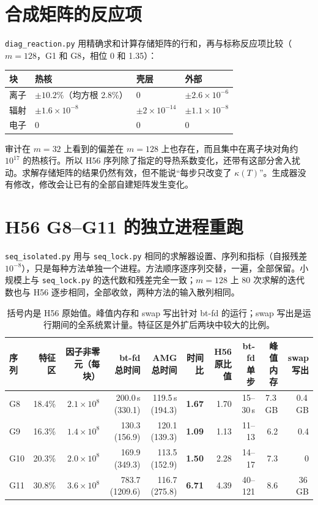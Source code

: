 \documentclass[11pt,a4paper]{ctexart}
\begin{document}
\section{合成矩阵的反应项}
\texttt{diag\_reaction.py} 用精确求和计算存储矩阵的行和，再与标称反应项比较（$m=128$，G1 和 G8，相位 0 和 1.35）：
\begin{table}[H]
\centering\small
\begin{tabular}{llll}
\toprule
块 & 热核 & 壳层 & 外部 \\
\midrule
离子 & $\pm10.2\%$（均方根 2.8\%） & 0 & $\pm2.6\times10^{-6}$ \\
辐射 & $\pm1.6\times10^{-8}$ & $\pm2\times10^{-14}$ & $\pm1.1\times10^{-8}$ \\
电子 & 0 & 0 & 0 \\
\bottomrule
\end{tabular}
\end{table}
审计在 $m=32$ 上看到的偏差在 $m=128$ 上也存在，而且集中在离子块对角约 $10^{17}$ 的热核行。所以 H56 序列除了指定的导热系数变化，还带有这部分舍入扰动。求解存储矩阵的结果仍然有效，但不能说“每步只改变了 $\kappa(T)$”。生成器没有修改，修改会让已有的全部自建矩阵发生变化。

\section{H56 G8--G11 的独立进程重跑}
\texttt{seq\_isolated.py} 用与 \texttt{seq\_lock.py} 相同的求解器设置、序列和指标（自报残差 $10^{-8}$），只是每种方法单独一个进程。方法顺序逐序列交替，一遍，全部保留。小规模上与 \texttt{seq\_lock.py} 的迭代数和残差完全一致；$m=128$ 上 80 次求解的迭代数也与 H56 逐步相同，全部收敛，两种方法的输入散列相同。

\begin{table}[H]
\centering\scriptsize\setlength{\tabcolsep}{3pt}
\begin{tabular}{lrrrrrrrrr}
\toprule
序列 & 特征区 & 因子非零元（每块） & bt-fd 总时间 & AMG 总时间 & 时间比 & H56 原比值 & bt-fd 单步 & 峰值内存 & swap 写出 \\
\midrule
G8 & 18.4\% & $2.1\times10^{8}$ & 200.0\,s (330.1) & 119.5\,s (194.3) & \textbf{1.67} & 1.70 & 15--30\,s & 7.3\,GB & 0.4\,GB \\
G9 & 16.3\% & $1.4\times10^{8}$ & 130.3 (156.9) & 120.1 (139.3) & \textbf{1.09} & 1.13 & 11--13 & 6.2 & 0.4 \\
G10 & 20.3\% & $2.0\times10^{8}$ & 169.9 (349.3) & 113.5 (152.9) & \textbf{1.50} & 2.28 & 14--17 & 7.3 & 0 \\
G11 & 30.8\% & $3.6\times10^{8}$ & 783.7 (1209.6) & 116.7 (275.8) & \textbf{6.71} & 4.39 & 40--121 & 8.6 & 36\,GB \\
\bottomrule
\end{tabular}
\caption{括号内是 H56 原始值。峰值内存和 swap 写出针对 bt-fd 的运行；swap 写出是运行期间的全系统累计量。特征区是外扩后两块中较大的比例。}
\end{table}
\end{document}
